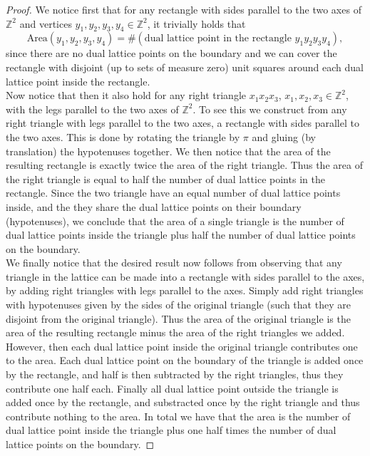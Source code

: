 \documentclass[a4paper,11pt]{article}
\newcommand{\Z}{\mathbb{Z}}
\newcommand{\Area}{\text{Area}}
\numberwithin{equation}{section}
\begin{document}
\begin{proof}
	We notice first that for any rectangle with sides parallel to the two axes of $ \Z^2 $ and vertices $ y_1,y_2,y_3,y_4\in \Z^2 $, it trivially holds that \begin{equation}
	\Area(y_1,y_2,y_3,y_4)=\#(\text{dual lattice point in the rectangle }y_1y_2y_3y_4),
	\end{equation}
	since there are no dual lattice points on the boundary and we can cover the rectangle with disjoint (up to sets of measure zero) unit squares around each dual lattice point inside the rectangle.\\
	Now notice that then it also hold for any right triangle $ x_1x_2x_3 $, $ x_1,x_2,x_3\in\Z^2 $,  with the legs parallel to the two axes of $ \Z^2 $. To see this we construct from any right triangle with legs parallel to the two axes, a rectangle with sides parallel to the two axes. This is done by rotating the triangle by $ \pi $ and gluing (by translation) the hypotenuses together. We then notice that the area of the resulting rectangle is exactly twice the area of the right triangle. Thus the area of the right triangle is equal to half the number of dual lattice points in the rectangle. Since the two triangle have an equal number of dual lattice points inside, and the they share the dual lattice points on their boundary (hypotenuses), we conclude that the area of a single triangle is the number of dual lattice points inside the triangle plus half the number of dual lattice points on the boundary.\\
	We finally notice that the desired result now follows from observing that any triangle in the lattice can be made into a rectangle with sides parallel to the axes, by adding right triangles with legs parallel to the axes. Simply add right triangles with hypotenuses given by the sides of the original triangle (such that they are disjoint from the original triangle). Thus the area of the original triangle is the area of the resulting rectangle minus the area of the right triangles we added. However, then each dual lattice point inside the original triangle contributes one to the area. Each dual lattice point on the boundary of the triangle is added once by the rectangle, and half is then subtracted by the right triangles, thus they contribute one half each. Finally all dual lattice point outside the triangle is added once by the rectangle, and substracted once by the right triangle and thus contribute nothing to the area. In total we have that the area is the number of dual lattice point inside the triangle plus one half times the number of dual lattice points on the boundary. 
\end{proof}
\end{document}
